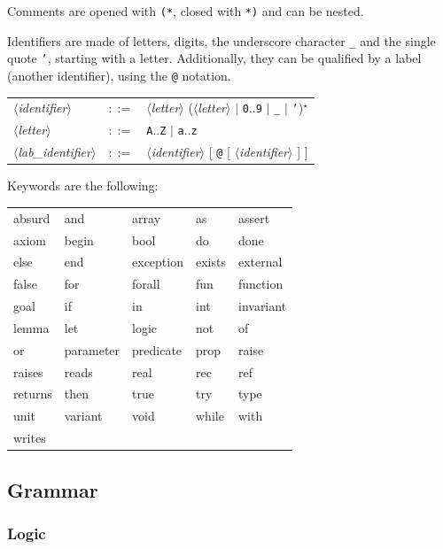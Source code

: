 \documentclass[a4paper,12pt]{report}
\makeatletter
\newcommand{\te}[1]{\texttt{#1}}
\newcommand{\nt}[1]{$\langle$\textsl{#1}$\rangle$}
\newcommand{\indexnt}[1]{\index{#1@\textsl{#1}, grammar entry}}
\newcommand{\etoile}{$^{\star}$}
\makeatother
\begin{document}
Comments are opened with \texttt{(*}, closed
with \texttt{*)} and can be nested.

Identifiers are made of letters, digits,
the underscore character \texttt{\_} and the single quote \texttt{'},
starting with a letter. Additionally, they can be qualified by a
label (another identifier), using the \texttt{@} notation.

\begin{center}
\begin{tabular}{lrl}
  \nt{identifier}\indexnt{identifier}
    & $::=$ & \nt{letter} (\nt{letter} $|$ \te{0}..\te{9} $|$
              \te{\_} $|$ \te{'})\etoile
  \\[0.1em]
  \nt{letter}
    & $::=$ & \te{A}..\te{Z} $|$ \te{a}..\te{z}
  \\[0.1em]
  \nt{lab\_identifier}\indexnt{lab\_identifier}
    & $::=$ & \nt{identifier} [ \te{@} [ \nt{identifier} ] ]
\end{tabular}
\end{center}

Keywords are the following:
\begin{center}
{\tt\begin{tabular}{l@{\qquad}l@{\qquad}l@{\qquad}l@{\qquad}l}
        absurd &
	and &
        array &
	as &
	assert \\
	axiom &
	begin &
        bool &
	do &
	done \\
        else &
	end &
	exception &
	exists &
	external \\
        false &
	for &
	forall &
	fun &
	function \\
	goal &
	if &
	in &
	int &
	invariant \\
        lemma &
	let &
	logic &
	not &
	of \\
	or &
	parameter &
	predicate &
	prop &
	raise \\
	raises &
	reads &
	real &
	rec &
	ref \\
	returns &
	then &
	true &
	try &
	type \\
	unit &
	variant &
	void &
	while &
	with \\
        writes &
\end{tabular}}
\end{center}

\subsection{Grammar}

\subsubsection{Logic}
\end{document}
